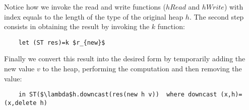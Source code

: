\documentclass[a4paper]{article}
\begin{document}
Notice how we invoke the read and write functions ($hRead$ and $hWrite$) with index equals to the length of the type of the original heap $h$. The second step consists in obtaining the result by invoking the $k$ function:

\begin{lstlisting}
    let (ST res)=k $r_{new}$
\end{lstlisting}

Finally we convert this result into the desired form by temporarily adding the new value $v$ to the heap, performing the computation and then removing the value:

\begin{lstlisting}
    in ST($\lambda$h.downcast(res(new h v))  where downcast (x,h)=(x,delete h)
\end{lstlisting}


\noindent 
\end{document}
